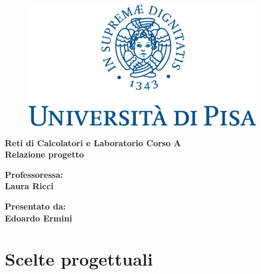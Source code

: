 \documentclass[11pt]{report}
\begin{document}
	
	\begin{titlepage}
		
		\linespread{2}
		
		\begin{figure}[t]
			\centering\includegraphics[width=0.9\textwidth]{unipi_logo}
		\end{figure}
		
		\begin{center}
			\vspace*{5mm}
			{\LARGE{\bf Reti di Calcolatori e Laboratorio Corso A}}\\
			\vspace{5mm}
			{\LARGE{\bf Relazione progetto}}\\
		\end{center}
		
		\vspace{10mm}
		
		
		\vspace{30mm}
		
		\hfill
		\begin{minipage}[t]{0.47\textwidth}\raggedright
			{\large{\bf Professoressa: \\ Laura Ricci\\ }}
		\end{minipage}
		\hfill
		\begin{minipage}[t]{0.47\textwidth}\raggedleft
			{\large{\bf Presentato da: \\ Edoardo Ermini\\ }}
		\end{minipage}
		
	\end{titlepage}

	\tableofcontents
	
	\chapter{Scelte progettuali}
	
\end{document}
